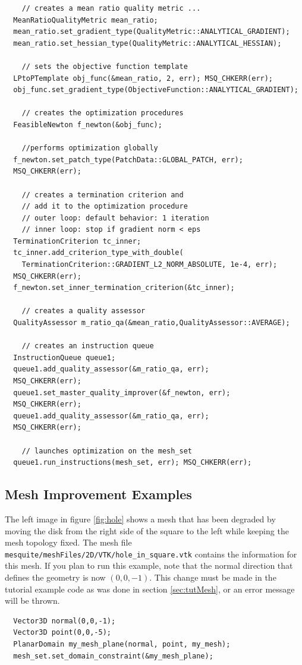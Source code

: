 \documentclass[letter]{report}
\begin{document}
\begin{verbatim}
    // creates a mean ratio quality metric ...
  MeanRatioQualityMetric mean_ratio;
  mean_ratio.set_gradient_type(QualityMetric::ANALYTICAL_GRADIENT);
  mean_ratio.set_hessian_type(QualityMetric::ANALYTICAL_HESSIAN);

    // sets the objective function template
  LPtoPTemplate obj_func(&mean_ratio, 2, err); MSQ_CHKERR(err);
  obj_func.set_gradient_type(ObjectiveFunction::ANALYTICAL_GRADIENT);
  
    // creates the optimization procedures
  FeasibleNewton f_newton(&obj_func);

    //performs optimization globally
  f_newton.set_patch_type(PatchData::GLOBAL_PATCH, err); 
  MSQ_CHKERR(err);

    // creates a termination criterion and 
    // add it to the optimization procedure
    // outer loop: default behavior: 1 iteration
    // inner loop: stop if gradient norm < eps
  TerminationCriterion tc_inner;
  tc_inner.add_criterion_type_with_double(
    TerminationCriterion::GRADIENT_L2_NORM_ABSOLUTE, 1e-4, err); 
  MSQ_CHKERR(err);
  f_newton.set_inner_termination_criterion(&tc_inner);

    // creates a quality assessor
  QualityAssessor m_ratio_qa(&mean_ratio,QualityAssessor::AVERAGE);

    // creates an instruction queue
  InstructionQueue queue1;
  queue1.add_quality_assessor(&m_ratio_qa, err); 
  MSQ_CHKERR(err);
  queue1.set_master_quality_improver(&f_newton, err); 
  MSQ_CHKERR(err);
  queue1.add_quality_assessor(&m_ratio_qa, err); 
  MSQ_CHKERR(err);

    // launches optimization on the mesh_set
  queue1.run_instructions(mesh_set, err); MSQ_CHKERR(err);
\end{verbatim} 

\subsection{Mesh Improvement Examples}

The left image in figure \ref{fig:hole} shows a mesh that has
been degraded by moving the disk from the right side of the square to
the left while keeping the mesh topology fixed.
The mesh file
\texttt{mesquite/meshFiles/2D/VTK/hole\_in\_square.vtk} contains the
information for this mesh.  If you plan to run this example, note that
the normal direction that defines the geometry is now $(0,0,-1)$.
This change must be made in the tutorial example code
as was done in section \ref{sec:tutMesh}, or an error message will be
thrown.
\begin{verbatim}
  Vector3D normal(0,0,-1);
  Vector3D point(0,0,-5);
  PlanarDomain my_mesh_plane(normal, point, my_mesh);
  mesh_set.set_domain_constraint(&my_mesh_plane);
\end{verbatim}
\end{document}
